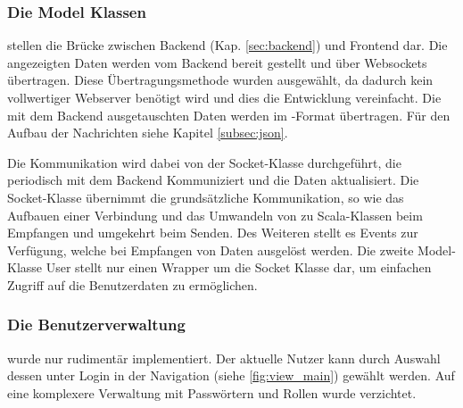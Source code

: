 \FloatBarrier
\subsubsection*{Die Model Klassen}
stellen die Brücke zwischen Backend (Kap. \ref{sec:backend}) und Frontend dar. Die angezeigten Daten werden vom Backend bereit gestellt und über Websockets übertragen. Diese Übertragungsmethode wurden ausgewählt, da dadurch kein vollwertiger Webserver benötigt wird und dies die Entwicklung vereinfacht. Die mit dem Backend ausgetauschten Daten werden im \JSON-Format übertragen. Für den Aufbau der Nachrichten siehe Kapitel \ref{subsec:json}. 

Die Kommunikation wird dabei von der Socket-Klasse durchgeführt, die periodisch mit dem Backend Kommuniziert und die Daten aktualisiert.
Die Socket-Klasse übernimmt die grundsätzliche Kommunikation, so wie das Aufbauen einer Verbindung und das Umwandeln von \JSON zu Scala-Klassen beim Empfangen und umgekehrt beim Senden. Des Weiteren stellt es Events zur Verfügung, welche bei Empfangen von Daten ausgelöst werden.
Die zweite Model-Klasse User stellt nur einen Wrapper um die Socket Klasse dar, um einfachen Zugriff auf die Benutzerdaten zu ermöglichen.

\FloatBarrier
\subsubsection*{Die Benutzerverwaltung}
wurde nur rudimentär implementiert. Der aktuelle Nutzer kann durch Auswahl dessen unter Login in der Navigation (siehe \autoref{fig:view_main}) gewählt werden. Auf eine komplexere Verwaltung mit Passwörtern und Rollen wurde verzichtet.